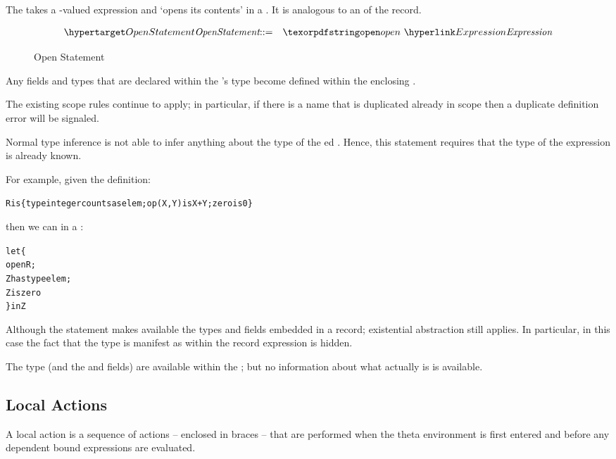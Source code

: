 The  takes a -valued expression and `opens its contents' in a . It is analogous to an  of the record.

\begin{figure}[htbp]
\begin{eqnarray*}
\ntDef{OpenStatement}&\arrow&\q{open}\ \ntRef{Expression}
\end{eqnarray*}
\caption{Open Statement}
\label{openStatementFig}
\end{figure}

Any fields and types that are declared within the 's type become defined within the enclosing .
\begin{aside}
The existing scope rules continue to apply; in particular, if there is a name that is duplicated already in scope then a duplicate definition error will be signaled. 
\end{aside}

\begin{aside}
Normal type inference is not able to infer anything about the type of the ed . Hence, this statement requires that the type of the expression is already known.
\end{aside}

For example, given the definition:
\begin{alltt}
R is \{ type integer counts as elem; op(X,Y) is X+Y; zero is 0 \}
\end{alltt}
then we can   in a :
\begin{alltt}
let\{
  open R;
  Z has type elem;
  Z is zero
\} in Z
\end{alltt}
\begin{aside}
Although the  statement makes available the types and fields embedded in a record; existential abstraction still applies. In particular, in this case the fact that the  type is manifest as  within the record expression  is hidden.

The  type (and the  and  fields) are available within the ; but no information about what  actually is is available.
\end{aside}

\subsection{Local Actions}
\label{localAction}
A local action is a sequence of actions -- enclosed in braces -- that are performed when the theta environment is first entered and before any dependent bound expressions are evaluated.

